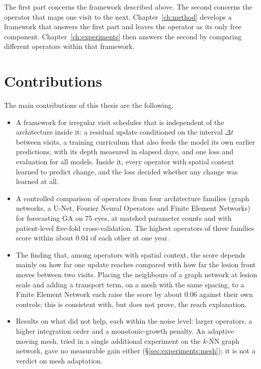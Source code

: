 The first part concerns the framework described above. The second
concerns the operator that maps one visit to the next. Chapter~\ref{ch:method}
develops a framework that answers the first part and leaves the operator
as its only free component. Chapter~\ref{ch:experiments} then answers the
second by comparing different operators within that framework.


\section{Contributions}
\label{sec:introduction:contributions}

The main contributions of this thesis are the following.
\begin{itemize}
  \item A framework for irregular visit schedules that is independent of
    the architecture inside it: a residual update conditioned on the
    interval $\Delta t$ between visits, a training curriculum that also
    feeds the model its own earlier predictions, with its depth measured in
    elapsed days, and one loss and evaluation for all models. Inside it,
    every operator with spatial context learned to predict change, and the
    loss decided whether any change was learned at all.
  \item A controlled comparison of operators from four architecture
    families (graph networks, a U-Net, Fourier Neural Operators and Finite
    Element Networks) for forecasting GA on 75 eyes, at matched parameter
    counts and with patient-level five-fold cross-validation. The highest
    operators of three families score within about 0.04 of each other at
    one year.
  \item The finding that, among operators with spatial context, the score
    depends mainly on how far one update reaches compared with how far the
    lesion front moves between two visits. Placing the neighbours of a
    graph network at lesion scale and adding a transport term, on a mesh
    with the same spacing, to a Finite Element Network each raise the score
    by about 0.06 against their own controls; this is consistent with, but
    does not prove, the reach explanation.
  \item Results on what did not help, each within the noise level: larger
    operators, a higher integration order and a monotonic-growth penalty.
    An adaptive moving mesh, tried in a single additional experiment on
    the $k$-NN graph network, gave no measurable gain either
    (\S\ref{sec:experiments:mesh}); it is not a verdict on mesh
    adaptation.
\end{itemize}


